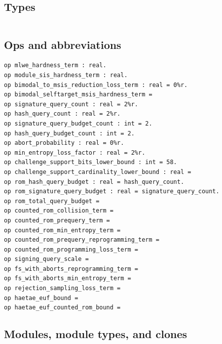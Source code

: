 \subsection*{Types}
\begin{lstlisting}[language=EasyCrypt,basicstyle=\ttfamily\tiny]
\end{lstlisting}

\subsection*{Ops and abbreviations}
\begin{lstlisting}[language=EasyCrypt,basicstyle=\ttfamily\tiny]
op mlwe_hardness_term : real.
op module_sis_hardness_term : real.
op bimodal_to_msis_reduction_loss_term : real = 0%r.
op bimodal_selftarget_msis_hardness_term =
op signature_query_count : real = 2%r.
op hash_query_count : real = 2%r.
op signature_query_budget_count : int = 2.
op hash_query_budget_count : int = 2.
op abort_probability : real = 0%r.
op min_entropy_loss_factor : real = 2%r.
op challenge_support_bits_lower_bound : int = 58.
op challenge_support_cardinality_lower_bound : real =
op rom_hash_query_budget : real = hash_query_count.
op rom_signature_query_budget : real = signature_query_count.
op rom_total_query_budget =
op counted_rom_collision_term =
op counted_rom_prequery_term =
op counted_rom_min_entropy_term =
op counted_rom_prequery_reprogramming_term =
op counted_rom_programming_loss_term =
op signing_query_scale =
op fs_with_aborts_reprogramming_term =
op fs_with_aborts_min_entropy_term =
op rejection_sampling_loss_term =
op haetae_euf_bound =
op haetae_euf_counted_rom_bound =
\end{lstlisting}

\subsection*{Modules, module types, and clones}
\begin{lstlisting}[language=EasyCrypt,basicstyle=\ttfamily\tiny]
\end{lstlisting}

